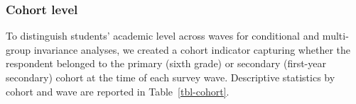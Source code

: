 \documentclass[
  13pt,
]{article}
\begin{document}
\subsubsection{Cohort level}\label{cohort-level}

To distinguish students' academic level across waves for conditional and
multi-group invariance analyses, we created a cohort indicator capturing
whether the respondent belonged to the primary (sixth grade) or
secondary (first-year secondary) cohort at the time of each survey wave.
Descriptive statistics by cohort and wave are reported in
Table~\ref{tbl-cohort}.

\begin{table}[H]

\caption{\label{tbl-cohort}Descriptive statistics for cohort level}


\end{table}%
\end{document}
